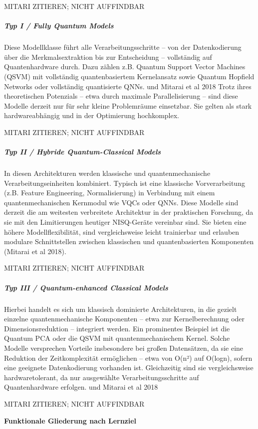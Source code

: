 MITARI ZITIEREN; NICHT AUFFINDBAR

\subparagraph{Typ I / Fully Quantum Models}
Diese Modellklasse führt alle Verarbeitungsschritte – von der Datenkodierung über die Merkmalsextraktion bis zur Entscheidung – vollständig auf Quantenhardware durch. Dazu zählen z.B. Quantum Support Vector Machines (QSVM) mit vollständig quantenbasiertem Kernelansatz sowie Quantum Hopfield Networks oder vollständig quantisierte QNNs. \cite{chengNoisyIntermediatescaleQuantum2023} und Mitarai et al 2018
Trotz ihres theoretischen Potenzials – etwa durch maximale Parallelisierung – sind diese Modelle derzeit nur für sehr kleine Problemräume einsetzbar. Sie gelten als stark hardwareabhängig und in der Optimierung hochkomplex.

MITARI ZITIEREN; NICHT AUFFINDBAR

\subparagraph{Typ II / Hybride Quantum-Classical Models}
In diesen Architekturen werden klassische und quantenmechanische Verarbeitungseinheiten kombiniert. Typisch ist eine klassische Vorverarbeitung (z.B. Feature Engineering, Normalisierung) in Verbindung mit einem quantenmechanischen Kernmodul wie VQCs oder QNNs.
Diese Modelle sind derzeit die am weitesten verbreitete Architektur in der praktischen Forschung, da sie mit den Limitierungen heutiger NISQ-Geräte vereinbar sind. Sie bieten eine höhere Modellflexibilität, sind vergleichsweise leicht trainierbar und erlauben modulare Schnittstellen zwischen klassischen und quantenbasierten Komponenten (Mitarai et al 2018).

MITARI ZITIEREN; NICHT AUFFINDBAR

\subparagraph{ Typ III / Quantum-enhanced Classical Models}
Hierbei handelt es sich um klassisch dominierte Architekturen, in die gezielt einzelne quantenmechanische Komponenten – etwa zur Kernelberechnung oder Dimensionsreduktion – integriert werden. Ein prominentes Beispiel ist die Quantum PCA oder die QSVM mit quantenmechanischem Kernel.
Solche Modelle versprechen Vorteile insbesondere bei großen Datensätzen, da sie eine Reduktion der Zeitkomplexität ermöglichen – etwa von O(n²) auf O(logn), sofern eine geeignete Datenkodierung vorhanden ist. Gleichzeitig sind sie vergleichsweise hardwaretolerant, da nur ausgewählte Verarbeitungsschritte auf Quantenhardware erfolgen.
\cite{chengNoisyIntermediatescaleQuantum2023} und Mitarai et al 2018

MITARI ZITIEREN; NICHT AUFFINDBAR

\vspace{1em}
\noindent\textbf{Funktionale Gliederung nach Lernziel}

